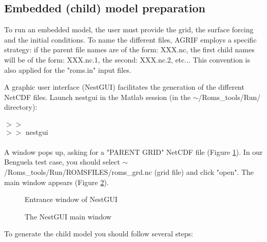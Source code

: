 \subsection{Embedded (child) model preparation}

To run an embedded model, the user must provide the grid, the surface 
forcing and the initial conditions. To name the different files,
AGRIF employs a specific strategy: if the parent file names are of
the form: XXX.nc, the first child names will be of the form: 
XXX.nc.1, the second: XXX.nc.2, etc... 
This convention is also applied for the "roms.in" input files.

A graphic user interface (NestGUI) facilitates the generation of 
the different NetCDF files. Launch nestgui in the Matlab session 
(in the $\sim$/Roms\_tools/Run/ directory):
\\ \\
$>>$\\
$>>$ nestgui
\\ \\
A window pops up, asking for a "PARENT GRID" NetCDF file 
(Figure \ref{fig:nestgui3}). In our Benguela test case, you should select 
$\sim$/Roms\_tools/Run/ROMSFILES/roms\_grd.nc (grid file) and click "open".
The main window appears (Figure \ref{fig:nestgui4}).

\begin{figure}[!ht]
\centerline{}
\caption{Entrance window of NestGUI}
\label{fig:nestgui3}
\end{figure}

\begin{figure}[!ht]
\centerline{}
\caption{The NestGUI main window}
\label{fig:nestgui4}
\end{figure} 


To generate the child model you should follow several steps:

